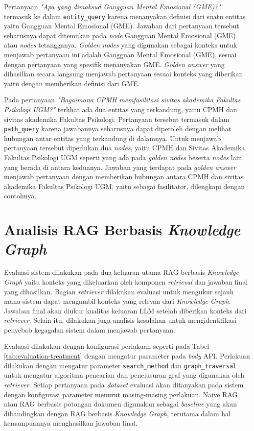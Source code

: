 Pertanyaan \textit{"Apa yang dimaksud Gangguan Mental Emosional (GME)?"} termasuk ke dalam \texttt{entity\_query} karena menanyakan definisi dari suatu entitas yaitu Gangguan Mental Emosional (GME).
Jawaban dari pertanyaan tersebut seharusnya dapat ditemukan pada \textit{node} Gangguan Mental Emosional (GME) atau \textit{nodes} tetangganya.
\textit{Golden nodes} yang digunakan sebagai konteks untuk menjawab pertanyaan ini adalah Gangguan Mental Emosional (GME), sesuai dengan pertanyaan yang spesifik menanyakan GME.
\textit{Golden answer} yang dihasilkan secara langsung menjawab pertanyaan sesuai konteks yang diberikan yaitu dengan memberikan definisi dari GME.

Pada pertanyaan \textit{"Bagaimana CPMH memfasilitasi sivitas akademika Fakultas Psikologi UGM?"} terlihat ada dua entitas yang terkandung, yaitu CPMH dan sivitas akademika Fakultas Psikologi.
Pertanyaan tersebut termasuk dalam \texttt{path\_query} karena jawabannya seharusnya dapat diperoleh dengan melihat hubungan antar entitas yang terkandung di dalamnya.
Untuk menjawab pertanyaan tersebut diperlukan dua \textit{nodes}, yaitu CPMH dan Sivitas Akademika Fakultas Psikologi UGM seperti yang ada pada \textit{golden nodes} beserta \textit{nodes} lain yang berada di antara keduanya.
Jawaban yang terdapat pada \textit{golden answer} menjawab pertanyaan dengan memberikan hubungan antara CPMH dan sivitas akademika Fakultas Psikologi UGM, yaitu sebagai fasilitator, dilengkapi dengan contohnya.

\section{Analisis RAG Berbasis \textit{Knowledge Graph}}
Evaluasi sistem dilakukan pada dua keluaran utama RAG berbasis \textit{Knowledge Graph} yaitu konteks yang dikeluarkan oleh komponen \textit{retrieval} dan jawaban final yang dihasilkan.
Bagian \textit{retriever} dilakukan evaluasi untuk mengukur sejauh mana sistem dapat mengambil konteks yang relevan dari \textit{Knowledge Graph}.
Jawaban final akan diukur kualitas keluaran LLM setelah diberikan konteks dari \textit{retriever}.
Selain itu, dilakukan juga analisis kesalahan untuk mengidentifikasi penyebab kegagalan sistem dalam menjawab pertanyaan.

Evaluasi dilakukan dengan konfigurasi perlakuan seperti pada Tabel \ref{tab:evaluation-treatment} dengan mengatur parameter pada \textit{body} API.
Perlakuan dilakukan dengan mengatur parameter \texttt{search\_method} dan \texttt{graph\_traversal} untuk mengatur algoritma pencarian dan penelusuran graf yang digunakan oleh \textit{retriever}.
Setiap pertanyaan pada \textit{dataset} evaluasi akan ditanyakan pada sistem dengan konfigurasi parameter menurut masing-masing perlakuan.
Naive RAG atau RAG berbasis potongan dokumen digunakan sebagai \textit{baseline} yang akan dibandingkan dengan RAG berbasis \textit{Knowledge Graph}, terutama dalam hal kemampuannya menghasilkan jawaban final.

